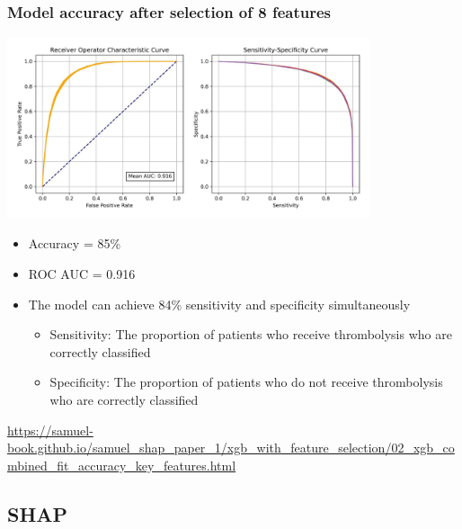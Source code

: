 \documentclass[xcolor={usenames,dvipsnames}]{beamer}
\newcommand{\smallurl}[1]{\textcolor{blue}{\fontsize{4pt}{4.8pt}\selectfont \url{#1}}}
\begin{document}

\begin{frame}
\frametitle{Model accuracy after selection of 8 features}

\vspace{-1em} 

\begin{center}
\includegraphics[width=0.8\textwidth]{./images/model_accuracy_with_8_features}
\end{center}

\vspace{-1em}

\begin{itemize}
    \footnotesize 
    \item Accuracy = 85\%
    \item ROC AUC = 0.916
    \item The model can achieve 84\% sensitivity and specificity simultaneously
    \begin{itemize}
        \tiny
        \item Sensitivity: The proportion of patients who receive thrombolysis who are correctly classified
        \item Specificity: The proportion of patients who do not receive thrombolysis who are correctly classified
    \end{itemize} 
\end{itemize}

\smallurl{https://samuel-book.github.io/samuel_shap_paper_1/xgb_with_feature_selection/02_xgb_combined_fit_accuracy_key_features.html}
\end{frame}




\subsection{SHAP} 
\end{document}
